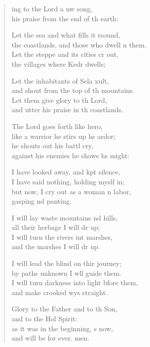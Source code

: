\settowidth{\versewidth}{I will turn darkness into light before them, *}
\begin{verse}%
  \begin{patverse}
ing to the Lord a nw song,\Med\\
his praise from the end of th earth:

Let the sea and what fills it rsound,\Med\\
the coastlands, and those who dwell \pointup{\i}n them.\\
Let the steppe and its cities cr out,\Med\\
the villages where Kedr dwells;

Let the inhabitants of Sela xult,\Med\\
and shout from the top of th mountains.\\
Let them give glory to th Lord,\Med\\
and utter his praise in th coastlands.

The Lord goes forth like  hero,\Med\\
like a warrior he stirs up h\pointup{\i}s ardor;\\
he shouts out his battl cry,\Med\\
against his enemies he shows h\pointup{\i}s might:

I have looked away, and kpt silence,\Med\\
I have said nothing, holding myslf in;\\
but now, I cry out as a woman \pointup{\i}n labor,\Med\\
gasping nd panting.

I will lay waste mountains nd hills,\Med\\
all their herbage I will dr up;\\
I will turn the rivers int marshes,\Med\\
and the marshes I will dr up.

I will lead the blind on thir journey;\Med\\
by paths unknown I w\pointup{\i}ll guide them.\\
I will turn darkness into light bfore them,\Med\\
and make crooked wys straight.

Glory to the Father and to th Son,\Med\\
    and to the Hol Spirit:\\
as it was in the beginning, \pointup{\i}s now,\Med\\
    and will be for ever. men.
  \end{patverse}
\end{verse}
